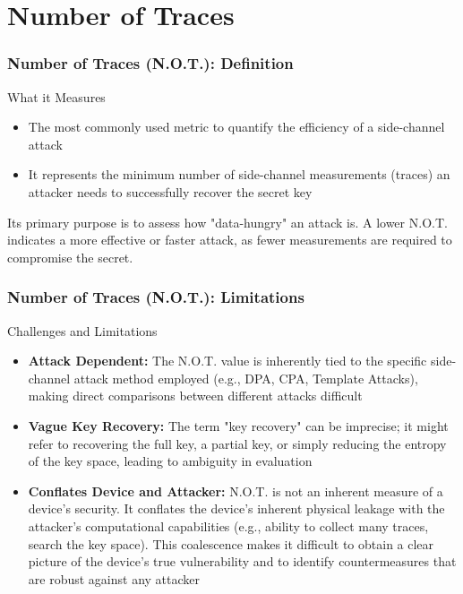 \section{Number of Traces}
\begin{frame}
    \frametitle{Number of Traces (N.O.T.): Definition}
    \begin{block}{What it Measures}
        \begin{itemize}
            \item The most commonly used metric to quantify the efficiency of a side-channel attack
            \item It represents the minimum number of side-channel measurements (traces) an attacker needs to successfully recover the secret key
        \end{itemize}
    \end{block}

\newline
    Its primary purpose is to assess how "data-hungry" an attack is. \newline \newline
    A lower N.O.T. indicates a more effective or faster attack, as fewer measurements are required to compromise the secret. \newline \newline
       
        
    
\end{frame}

\begin{frame}
    \frametitle{Number of Traces (N.O.T.): Limitations}
    \begin{block}{Challenges and Limitations}
        \begin{itemize}
            \item \textbf{Attack Dependent:} The N.O.T. value is inherently tied to the specific side-channel attack method employed (e.g., DPA, CPA, Template Attacks), making direct comparisons between different attacks difficult
            \item \textbf{Vague Key Recovery:} The term "key recovery" can be imprecise; it might refer to recovering the full key, a partial key, or simply reducing the entropy of the key space, leading to ambiguity in evaluation
            \item \textbf{Conflates Device and Attacker:} N.O.T. is not an inherent measure of a device's security. It conflates the device's inherent physical leakage with the attacker's computational capabilities (e.g., ability to collect many traces, search the key space). This coalescence makes it difficult to obtain a clear picture of the device's true vulnerability and to identify countermeasures that are robust against any attacker

        \end{itemize}
    \end{block}
\end{frame}